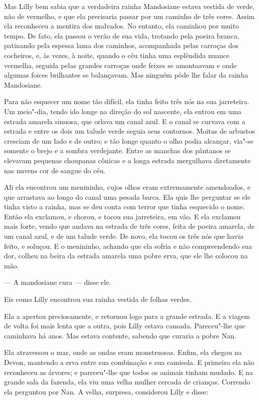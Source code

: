 Mas Lilly bem sabia que a verdadeira rainha Mandosiane estava vestida
de verde, não de vermelho, e que ela precisaria passar por um caminho de
três cores. Assim ela reconheceu a mentira dos malvados. No entanto, ela
caminhou por muito tempo. De fato, ela passou o verão de sua vida,
trotando pela poeira branca, patinando pela espessa lama dos caminhos,
acompanhada pelas carroças dos cocheiros, e, às vezes, à noite, quando o
céu tinha uma esplêndida nuance vermelha, seguida pelas grandes carroças
onde feixes se amontoavam e onde algumas foices brilhantes se balançavam.
Mas ninguém pôde lhe falar da rainha Mandosiane.

Para não esquecer um nome tão difícil, ela tinha feito três nós na sua
jarreteira. Um meio"-dia, tendo ido longe na direção do sol nascente, ela
entrou em uma estrada amarela sinuosa, que orlava um canal azul. E o canal
se curvava com a estrada e entre os dois um talude verde seguia seus
contornos. Moitas de arbustos cresciam de um lado e de outro; e tão longe
quanto o olho podia alcançar, via"-se somente o brejo e a sombra
verdejante. Entre as manchas dos pântanos se elevavam pequenas choupanas
cônicas e a longa estrada mergulhava diretamente nas nuvens cor de sangue
do céu.

Ali ela encontrou um menininho, cujos olhos eram extremamente
amendoados, e que arrastava ao longo do canal uma pesada barca. Ela quis
lhe perguntar se ele tinha visto a rainha, mas se deu conta com terror que
tinha esquecido o nome. Então ela exclamou, e chorou, e tocou sua
jarreteira, em vão. E ela exclamou mais forte, vendo que andava na estrada
de três cores, feita de poeira amarela, de um canal azul, e de um talude
verde. De novo, ela tocou os três nós que havia feito, e soluçou. E o
menininho, achando que ela sofria e não compreendendo sua dor, colheu na
beira da estrada amarela uma pobre erva, que ele lhe colocou na mão.

--- A mandosiane cura --- disse ele.

Eis como Lilly encontrou sua rainha vestida de folhas verdes.

Ela a apertou preciosamente, e retornou logo para a grande estrada. E a
viagem de volta foi mais lenta que a outra, pois Lilly estava cansada.
Pareceu"-lhe que caminhava há anos. Mas estava contente, sabendo que
curaria a pobre Nan.

Ela atravessou o mar, onde as ondas eram monstruosas. Enfim, ela chegou
na Devon, mantendo a erva entre sua combinação e sua camisola. E primeiro
ela não reconheceu as árvores; e pareceu"-lhe que todos os animais tinham
mudado. E na grande sala da fazenda, ela viu uma velha mulher cercada de
crianças. Correndo ela perguntou por Nan. A velha, surpresa, considerou
Lilly e disse:

